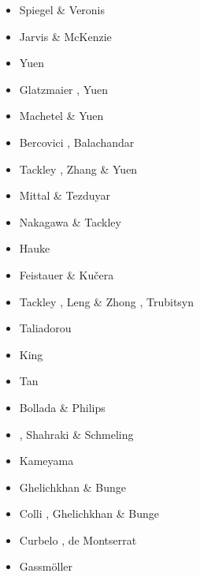 \begin{scriptsize}
\begin{itemize}
\item[\nineteensixty] Spiegel \& Veronis \cite{spve60}
\item[\nineteeneighty] Jarvis \& McKenzie \cite{jamc80}
\item[\nineteeneightyseven]  Yuen \etal \cite{yuqh87}
\item[\nineteeneightyeight] Glatzmaier \cite{glat88}, Yuen \etal \cite{yuzl88} 
\item[\nineteeneightynine] Machetel \& Yuen \cite{mayu89} 
\item[\nineteenninetytwo] Bercovici \etal \cite{besg92}, Balachandar \etal \cite{bayr92}
\item[\nineteenninetysix] Tackley \cite{tack96}, Zhang \& Yuen \cite{zhyu96}
\item[\nineteenninetyeight] Mittal \& Tezduyar \cite{mite98} 
\item[\twothousandfour] Nakagawa \& Tackley \cite{nata04}
\item[\twothousandfive] Hauke \etal \cite{halg05a,halg05b}
\item[\twothousandseven] Feistauer \& Ku{\v{c}}era \cite{feku07} 
\item[\twothousandeight] Tackley \cite{tack08}, Leng \& Zhong \cite{lezh08}, Trubitsyn \cite{trub08}
\item[\twothousandnine] Taliadorou \etal \cite{tagm09} 
\item[\twothousandten] King \etal \cite{kilv10}
\item[\twothousandeleven] Tan \etal \cite{talz11}
\item[\twothousandtwelve] Bollada \& Philips \cite{boph12}
\item[\twothousandthirteen] \cite{lizh13}, Shahraki \& Schmeling \cite{shsc13}
\item[\twothousandfifteen] Kameyama \etal \cite{kamo15}
\item[\twothousandsixteen] Ghelichkhan \& Bunge \cite{ghbu16}
\item[\twothousandeighteen] Colli \etal \cite{cogb18}, Ghelichkhan \& Bunge \cite{ghbu18}
\item[\twothousandnineteen] Curbelo \etal \cite{cuda19}, de Montserrat \etal \cite{demh19}
\item[\twothousandtwenty] Gassm{\"o}ller \etal \cite{gadb20}
\end{itemize}
\end{scriptsize}

